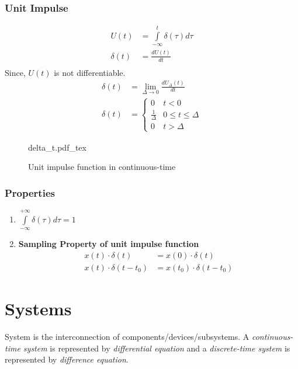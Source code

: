 \documentclass[oneside]{book}
\newcommand{\incfig}[1]{%
    {#1.pdf_tex}
}
\begin{document}
\subsubsection{Unit Impulse}
\begin{align*}
	U(t)      & = \int\limits_{-\infty}^{t}\delta(\tau)d\tau \\
	\delta(t) & = \frac{dU(t)}{dt}                           \\
\end{align*}
Since, \(U(t)\) is not differentiable.
\begin{align*}
	\delta(t) & = \lim_{\Delta\rightarrow 0}\frac{dU_\Delta(t)}{dt} \\
	\delta(t) & = \begin{cases}
		0                & t<0                  \\
		\frac{1}{\Delta} & 0 \leq t \leq \Delta \\
		0                & t>\Delta
	\end{cases}
\end{align*}
\begin{figure}[ht]
	\centering
	\incfig{delta_t}
	\caption{Unit impulse function in continuous-time}
\end{figure}
\subsubsection{Properties}
\begin{enumerate}
	\item \(\displaystyle\int\limits_{-\infty}^{+\infty}\delta(\tau)d\tau = 1\)
	\item \textbf{Sampling Property of unit impulse function}
	      \begin{align*}
		      x(t)\cdot\delta(t)     & = x(0)\cdot\delta(t)         \\
		      x(t)\cdot\delta(t-t_0) & = x(t_0)\cdot\delta(t - t_0)
	      \end{align*}
\end{enumerate}

\section{Systems}
System is the interconnection of components/devices/subsystems. A \textit{continuous-time system} is represented by \textit{differential equation} and a \textit{discrete-time system} is represented by \textit{difference equation}.
\end{document}

